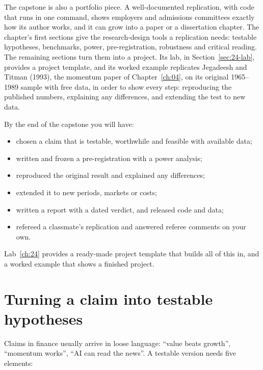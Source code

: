 The capstone is also a portfolio piece. A well-documented replication, with code that runs in one command, shows employers and admissions committees exactly how its author works, and it can grow into a paper or a dissertation chapter. The chapter's first sections give the research-design tools a replication needs: testable hypotheses, benchmarks, power, pre-registration, robustness and critical reading. The remaining sections turn them into a project. Its lab, in Section~\ref{sec:24-lab}, provides a project template, and its worked example replicates Jegadeesh and Titman (1993), the momentum paper of Chapter~\ref{ch:04}, on its original 1965--1989 sample with free data, in order to show every step: reproducing the published numbers, explaining any differences, and extending the test to new data.

By the end of the capstone you will have:

\begin{itemize}
  \item chosen a claim that is testable, worthwhile and feasible with available data;
  \item written and frozen a pre-registration with a power analysis;
  \item reproduced the original result and explained any differences;
  \item extended it to new periods, markets or costs;
  \item written a report with a dated verdict, and released code and data;
  \item refereed a classmate's replication and answered referee comments on your own.
\end{itemize}

Lab~\ref{ch:24} provides a ready-made project template that builds all of this in, and a worked example that shows a finished project.


\section{Turning a claim into testable hypotheses}
\label{sec:24-hypotheses}

Claims in finance usually arrive in loose language: ``value beats growth'', ``momentum works'', ``AI can read the news''. A testable version needs five elements:


